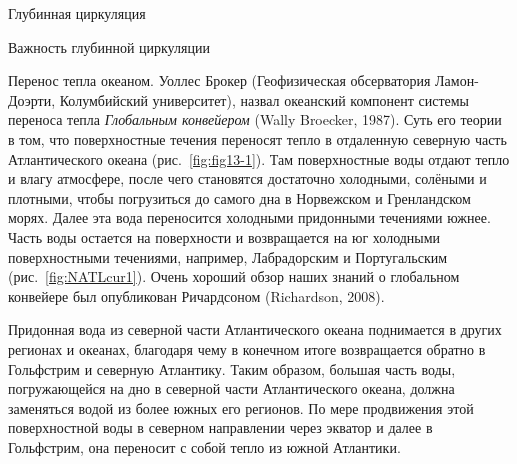\begin{chapter}{Глубинная циркуляция}
\begin{section}{Важность глубинной циркуляции}
\begin{paragraph}{Перенос тепла океаном.}
Уоллес Брокер (Геофизическая обсерватория Ламон-Доэрти, Колумбийский 
университет), назвал океанский компонент системы переноса 
тепла \emph{Глобальным конвейером}%
(Wally Broecker, 1987). Суть его теории в том, что поверхностные течения
переносят тепло в отдаленную северную часть Атлантического океана 
(рис.~\ref{fig:fig13-1}). Там поверхностные воды отдают тепло и влагу 
атмосфере, после чего становятся достаточно холодными, солёными и плотными,
чтобы погрузиться до самого дна 
в Норвежском и Гренландском морях. Далее эта вода переносится холодными 
придонными течениями южнее. Часть воды остается на поверхности и возвращается
на юг холодными поверхностными течениями, например, Лабрадорским 
и Португальским (рис.~\ref{fig:NATLcur1}). Очень хороший обзор наших знаний
о глобальном конвейере был опубликован Ричардсоном (Richardson, 2008).
%

Придонная вода из северной части Атлантического 
океана поднимается
в других регионах и океанах, благодаря чему в конечном итоге возвращается
обратно в Гольфстрим и северную Атлантику. Таким образом, большая часть воды,
погружающейся на дно в северной части Атлантического океана, должна заменяться
водой из более южных его регионов. По мере продвижения этой поверхностной воды
в северном направлении через экватор и далее в Гольфстрим, она переносит
с собой тепло из южной Атлантики.
%


\end{paragraph}
\end{section}
\end{chapter}
